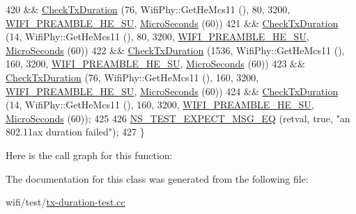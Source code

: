 \begin{DoxyCode}
420     && \hyperlink{classTxDurationTest_ac86b852957ecf1a1bed4f4e48debb30e}{CheckTxDuration} (76, WifiPhy::GetHeMcs11 (), 80, 3200, 
      \hyperlink{group__wifi_gga5e94a56cb338a14ffbbb19c6a41251eba99c3e12c6e91fc9a9bee491d20dab807}{WIFI\_PREAMBLE\_HE\_SU}, \hyperlink{group__timecivil_ga17465a639c8d1464e76538afdd78a9f0}{MicroSeconds} (60))
421     && \hyperlink{classTxDurationTest_ac86b852957ecf1a1bed4f4e48debb30e}{CheckTxDuration} (14, WifiPhy::GetHeMcs11 (), 80, 3200, 
      \hyperlink{group__wifi_gga5e94a56cb338a14ffbbb19c6a41251eba99c3e12c6e91fc9a9bee491d20dab807}{WIFI\_PREAMBLE\_HE\_SU}, \hyperlink{group__timecivil_ga17465a639c8d1464e76538afdd78a9f0}{MicroSeconds} (60))
422     && \hyperlink{classTxDurationTest_ac86b852957ecf1a1bed4f4e48debb30e}{CheckTxDuration} (1536, WifiPhy::GetHeMcs11 (), 160, 3200, 
      \hyperlink{group__wifi_gga5e94a56cb338a14ffbbb19c6a41251eba99c3e12c6e91fc9a9bee491d20dab807}{WIFI\_PREAMBLE\_HE\_SU}, \hyperlink{group__timecivil_ga17465a639c8d1464e76538afdd78a9f0}{MicroSeconds} (60))
423     && \hyperlink{classTxDurationTest_ac86b852957ecf1a1bed4f4e48debb30e}{CheckTxDuration} (76, WifiPhy::GetHeMcs11 (), 160, 3200, 
      \hyperlink{group__wifi_gga5e94a56cb338a14ffbbb19c6a41251eba99c3e12c6e91fc9a9bee491d20dab807}{WIFI\_PREAMBLE\_HE\_SU}, \hyperlink{group__timecivil_ga17465a639c8d1464e76538afdd78a9f0}{MicroSeconds} (60))
424     && \hyperlink{classTxDurationTest_ac86b852957ecf1a1bed4f4e48debb30e}{CheckTxDuration} (14, WifiPhy::GetHeMcs11 (), 160, 3200, 
      \hyperlink{group__wifi_gga5e94a56cb338a14ffbbb19c6a41251eba99c3e12c6e91fc9a9bee491d20dab807}{WIFI\_PREAMBLE\_HE\_SU}, \hyperlink{group__timecivil_ga17465a639c8d1464e76538afdd78a9f0}{MicroSeconds} (60));
425 
426   \hyperlink{group__testing_ga7304ba46a28d8cf08dfdfd6499cf7068}{NS\_TEST\_EXPECT\_MSG\_EQ} (retval, \textcolor{keyword}{true}, \textcolor{stringliteral}{"an 802.11ax duration failed"});
427 \}
\end{DoxyCode}


Here is the call graph for this function\+:




The documentation for this class was generated from the following file\+:\begin{DoxyCompactItemize}
\item 
wifi/test/\hyperlink{tx-duration-test_8cc}{tx-\/duration-\/test.\+cc}\end{DoxyCompactItemize}
